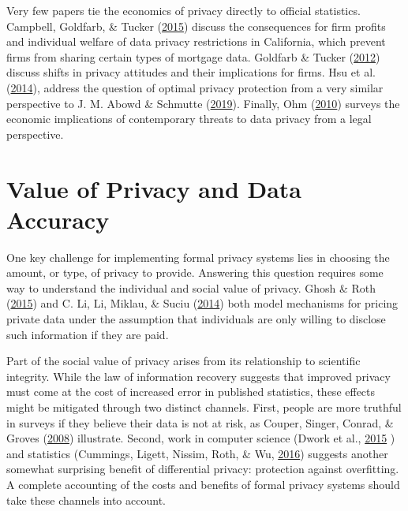 \documentclass[]{article}
\begin{document}
Very few papers tie the economics of privacy directly to official
statistics. Campbell, Goldfarb, \& Tucker
(\protect\hyperlink{ref-Campbell:Privacy:JEMS}{2015}) discuss the
consequences for firm profits and individual welfare of data privacy
restrictions in California, which prevent firms from sharing certain
types of mortgage data. Goldfarb \& Tucker
(\protect\hyperlink{ref-Goldfarb:Shifts:AERPP:2012}{2012}) discuss
shifts in privacy attitudes and their implications for firms. Hsu et al.
(\protect\hyperlink{ref-Hsu:EconomicEpsilon:IEEE:2014}{2014}), address
the question of optimal privacy protection from a very similar
perspective to J. M. Abowd \& Schmutte
(\protect\hyperlink{ref-AbowdSchmutte:Privacy:AER}{2019}). Finally, Ohm
(\protect\hyperlink{ref-Ohm:Broken:UCLALR:2010}{2010}) surveys the
economic implications of contemporary threats to data privacy from a
legal perspective.

\hypertarget{value-of-privacy-and-data-accuracy}{\section{Value of
Privacy and Data Accuracy}\label{value-of-privacy-and-data-accuracy}}

One key challenge for implementing formal privacy systems lies in
choosing the amount, or type, of privacy to provide. Answering this
question requires some way to understand the individual and social value
of privacy. Ghosh \& Roth
(\protect\hyperlink{ref-Ghosh:Auction:GEB:2015}{2015}) and C. Li, Li,
Miklau, \& Suciu (\protect\hyperlink{ref-Li2014}{2014}) both model
mechanisms for pricing private data under the assumption that
individuals are only willing to disclose such information if they are
paid.

Part of the social value of privacy arises from its relationship to
scientific integrity. While the law of information recovery suggests
that improved privacy must come at the cost of increased error in
published statistics, these effects might be mitigated through two
distinct channels. First, people are more truthful in surveys if they
believe their data is not at risk, as Couper, Singer, Conrad, \& Groves
(\protect\hyperlink{ref-couper2008risk}{2008}) illustrate. Second, work
in computer science (Dwork et al.,
\protect\hyperlink{ref-Dwork:Generalization:NIPS:2015}{2015} ) and
statistics (Cummings, Ligett, Nissim, Roth, \& Wu,
\protect\hyperlink{ref-cummings:adaptive:corr:2016}{2016}) suggests
another somewhat surprising benefit of differential privacy: protection
against overfitting. A complete accounting of the costs and benefits of
formal privacy systems should take these channels into account.
\end{document}
